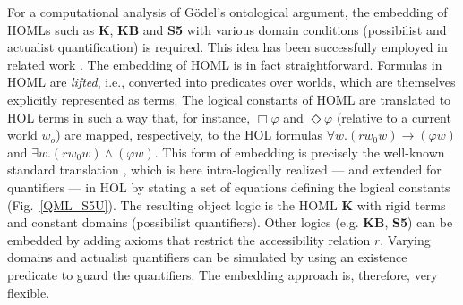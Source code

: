 \documentclass{article}
\newcommand{\imp}{{\rightarrow}}
\begin{document}

For a computational analysis of G\"odel's ontological argument, the embedding of HOMLs such as \textbf{K},
\textbf{KB} and \textbf{S5} with various domain conditions (possibilist and actualist quantification)
is required. This idea has been successfully employed in related work
\cite{C40}. The embedding of HOML is in fact
straightforward. Formulas in HOML are \emph{lifted}, i.e., converted into predicates
over worlds, which are themselves explicitly represented as
terms. The logical constants of HOML are translated to HOL terms in such a way that, for instance, 
$\Box \varphi$ and $\Diamond \varphi$ (relative to a current world
$w_o$) are mapped, respectively, to the HOL formulas
$\forall w. (r w_0 w) \imp (\varphi w)$ and
$\exists w. (r w_0 w) \wedge (\varphi w)$. This form of embedding is
precisely the well-known standard translation
\cite{DBLP:journals/logcom/Ohlbach91}, which is here intra-logically
realized --- and extended for quantifiers --- in HOL by stating a set
of equations defining the logical constants (Fig.~\ref{QML_S5U}). The
resulting object logic is the HOML \textbf{K} with rigid terms and constant
domains (possibilist quantifiers). Other logics (e.g. \textbf{KB}, \textbf{S5}) can be
embedded by adding axioms that restrict the accessibility relation
$r$. Varying domains and actualist quantifiers can be simulated by using
 an existence predicate to guard the
quantifiers. The embedding approach is, therefore, very flexible.
\end{document}
